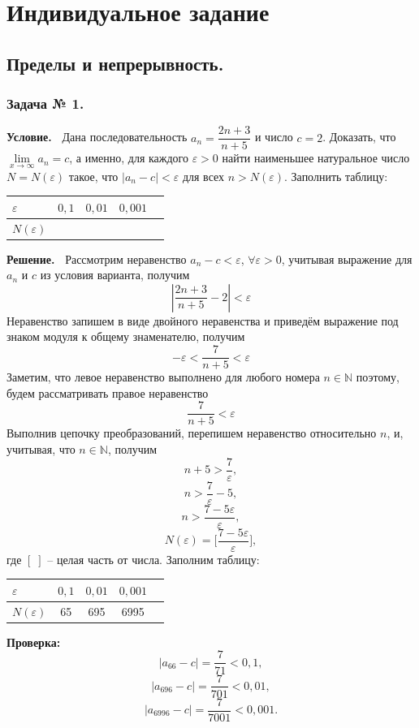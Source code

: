 \documentclass[12pt]{article}
\begin{document}
\section{Индивидуальное задание}
%
\subsection{Пределы и непрерывность.}
\subsubsection*{\center Задача № 1.}
{\bf Условие.~}
Дана последовательность $a_{n}=\dfrac{2n+3}{n+5}$ и число $c=2$. Доказать, что $\lim\limits_{x\rightarrow\infty} a_{n}=c $, а именно, для каждого $\varepsilon>0$ найти наименьшее натуральное число  $N{=}N(\varepsilon)$ такое, что $|a_{n}-c|<\varepsilon$ для всех $n>N(\varepsilon)$. Заполнить таблицу: 
\begin{center}
	\begin{tabular}{ | p{25pt} | c | c | c | c |}
		\hline
		$\varepsilon$& $0{,}1$ & $0{,}01$ & $0{,}001$ \\ \hline
		$N(\varepsilon)$ &   &   &\\
		\hline
	\end{tabular}
\end{center}
\medskip
{\bf Решение.~}
Рассмотрим неравенство $a_{n}-c<\varepsilon$, $\forall\varepsilon>0$, учитывая выражение для $a_{n}$ и $c$ из условия варианта, получим 
$$\left|\frac{2n+3}{n+5}-2\right|<\varepsilon$$
Неравенство запишем в виде двойного неравенства и приведём выражение под знаком модуля к общему знаменателю, получим
$${-}\varepsilon <\dfrac{7}{n+5}<\varepsilon$$
Заметим, что левое неравенство выполнено для любого номера $n\in \mathbb{N}$ поэтому, будем рассматривать правое неравенство
$$\frac{7}{n+5}<\varepsilon$$
Выполнив цепочку преобразований, перепишем неравенство относительно $n$, и, учитывая, что $n\in \mathbb{N}$, получим 
$$n+5>\dfrac{7}{\varepsilon},$$
$$n>\dfrac{7}{\varepsilon}-5,$$
$$n>\dfrac{7-5\varepsilon}{\varepsilon},$$
$$N(\varepsilon)=\biggl[\dfrac{7-5\varepsilon}{\varepsilon}\biggr],$$
где $[\;]$ -- целая часть от числа. Заполним таблицу:
\begin{center}
	\begin{tabular}{ | p{25pt} | c | c | c | c |}
		\hline
		$\varepsilon$& $0{,}1$ & $0{,}01$ & $0{,}001$ \\ \hline
		$N(\varepsilon)$ & 65  & 695 & 6995\\
		\hline
	\end{tabular}
\end{center}
{\bf Проверка:~}
$$|a_{66}-c|=\dfrac{7}{71}<0{,}1,$$
$$|a_{696}-c|=\dfrac{7}{701}<0{,}01,$$
$$|a_{6996}-c|=\dfrac{7}{7001}<0{,}001.$$
\newpage
\end{document}
